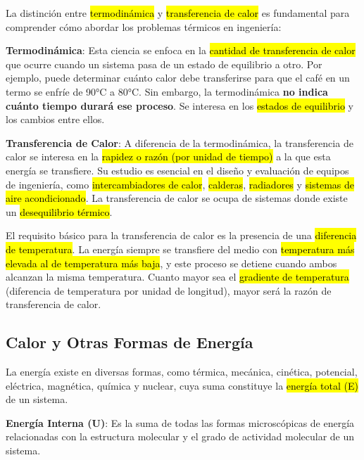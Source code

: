 \documentclass{article}
\begin{document}
    La distinción entre \hl{termodinámica} y \hl{transferencia de calor} es fundamental para comprender cómo abordar los problemas térmicos en ingeniería:

    \textbf{Termodinámica}: Esta ciencia se enfoca en la \hl{cantidad de transferencia de calor} que ocurre cuando un sistema pasa de un estado de equilibrio a otro. Por ejemplo, puede determinar cuánto calor debe transferirse para que el café en un termo se enfríe de 90°C a 80°C. Sin embargo, la termodinámica \textbf{no indica cuánto tiempo durará ese proceso}. Se interesa en los \hl{estados de equilibrio} y los cambios entre ellos.

    \textbf{Transferencia de Calor}: A diferencia de la termodinámica, la transferencia de calor se interesa en la \hl{rapidez o razón (por unidad de tiempo)} a la que esta energía se transfiere. Su estudio es esencial en el diseño y evaluación de equipos de ingeniería, como \hl{intercambiadores de calor}, \hl{calderas}, \hl{radiadores} y \hl{sistemas de aire acondicionado}. La transferencia de calor se ocupa de sistemas donde existe un \hl{desequilibrio térmico}.

    El requisito básico para la transferencia de calor es la presencia de una \hl{diferencia de temperatura}. La energía siempre se transfiere del medio con \hl{temperatura más elevada al de temperatura más baja}, y este proceso se detiene cuando ambos alcanzan la misma temperatura. Cuanto mayor sea el \hl{gradiente de temperatura} (diferencia de temperatura por unidad de longitud), mayor será la razón de transferencia de calor.

    \subsection{Calor y Otras Formas de Energía}

    La energía existe en diversas formas, como térmica, mecánica, cinética, potencial, eléctrica, magnética, química y nuclear, cuya suma constituye la \hl{energía total (E)} de un sistema.

    \textbf{Energía Interna (U)}: Es la suma de todas las formas microscópicas de energía relacionadas con la estructura molecular y el grado de actividad molecular de un sistema.
\end{document}

